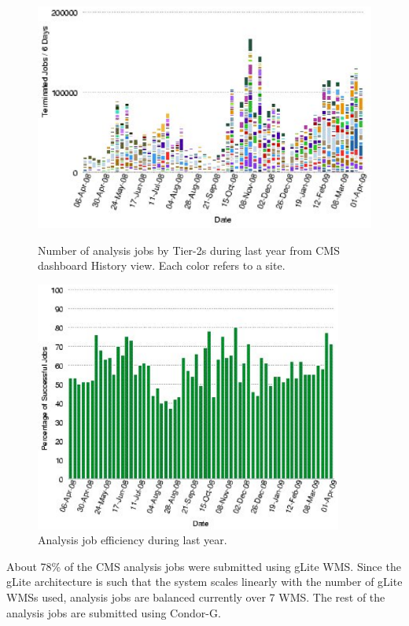 \begin{figure}
\begin{minipage}{.55\textwidth}
\centering
\includegraphics[width=1.0\textwidth]{AnalysisJobHistoryApril0809.eps}
\caption{Number of analysis jobs by Tier-2s during last year from CMS dashboard History view. Each color refers to a site. }
\label{fig:AnalysisJobHistoryApril0809}
\end{minipage}
\begin{minipage}{.45\textwidth}
\centering
\includegraphics[width=0.9\textwidth]{T2EffApril0809.eps}
\caption{Analysis job efficiency during last year. }
\label{fig:T2EffApril0809}
\end{minipage}
\end{figure}

About 78\% of the CMS analysis jobs were submitted using gLite WMS.  Since the gLite architecture is such that the system scales linearly with the number of gLite WMSs used, analysis jobs are balanced currently over 7 WMS. The rest of the analysis jobs are submitted using Condor-G.

